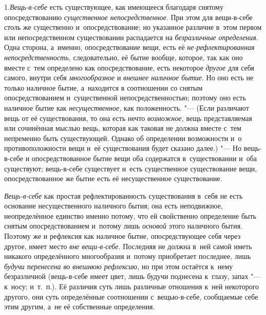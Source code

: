 1.{\em Вещь-в-себе} есть
существующее, как имеющееся благодаря снятому опосредствованию
{\em существенное непосредственное}. При этом для
вещи-в-себе столь же существенно и~опосредствование; но указанное различие
в~этом первом или непосредственном существовании распадается на
{\em безразличные определения}. Одна сторона, а~именно,
опосредствование вещи, есть её {\em не-рефлектированная
непосредственность,} следовательно, её бытие вообще, которое, так как оно
вместе с~тем определено как опосредствование, есть некоторое
{\em другое} для себя самого, внутри себя {\em многообразное} и {\em внешнее
наличное бытие}. Но оно есть не только наличное бытие, а~находится в
соотношении со снятым опосредствованием и~существенной непосредственностью;
поэтому оно есть наличное бытие как
{\em несущественное,} как положенность. "--- (Если
различают вещь от её существования, то она есть нечто
{\em возможное,} вещь представляемая или сочинённая
мыслью вещь, которая как таковая не должна вместе с~тем непременно быть
существующей. Однако об определении возможности и~о противоположности вещи
и~её существования будет сказано далее.) "--- Но вещь-в-себе и
опосредствованное бытие вещи оба содержатся в~существовании и~оба
существуют; вещь-в-себе существует и~есть существенное существование вещи,
опосредствованное же бытие есть её несущественное существование.

{\em Вещь-в-себе} как простая рефлектированность
существования в~себя не есть основание несущественного наличного бытия; она
есть неподвижное, неопределённое единство именно потому, что ей свойственно
определение быть снятым опосредствованием и~потому лишь
{\em основой} этого наличного бытия. Поэтому же и
рефлексия как наличное бытие, опосредствующее себя через другое, имеет
место {\em вне вещи-в-себе}. Последняя не должна в~ней
самой иметь никакого определённого многообразия и~потому приобретает
последнее, лишь {\em будучи перенесена во внешнюю
рефлексию,} но при этом остаётся к~нему безразличной (вещь-в-себе имеет
цвет, лишь будучи поднесена к~глазу, запах "--- к~носу; и~т.~п.). Её различия
суть лишь различные отношения к~ней некоторого другого, они суть
определённые соотношении с~вещью-в-себе, сообщаемые себе этим другим, а~не
её собственные определения.

